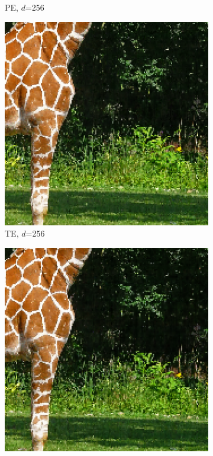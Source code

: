 \begin{figure}[!h]
\begin{subfigure}{.25\textwidth}
    \caption{PE, $d$=256}
    \label{PE256}
  \end{subfigure}\hfil
  \begin{subfigure}{.25\textwidth}
    \includegraphics[width=\textwidth]{Bilder/Giraffe/Bildausschnitte/image_result_tent12000_indim256_lr0.006667_m64.eps}
    \caption{TE, $d$=256}
    \label{TE256}
  \end{subfigure}\hfil
  \begin{subfigure}{.25\textwidth}
    \includegraphics[width=\textwidth]{Bilder/Giraffe/Bildausschnitte/image_result_magnitude12000_indim256_lr0.006667_sigma0.007.eps}

\end{subfigure}
\end{figure}
